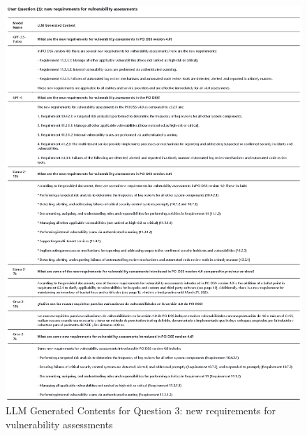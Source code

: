 \documentclass[runningheads]{llncs}
\begin{document}
\begin{figure}
    \centering
    \includegraphics[width=1.3\linewidth]{figures/question_3.eps}
    \caption{LLM Generated Contents for Question 3: new requirements for vulnerability assessments}
    \label{fig:Question  3}
\end{figure}
\end{document}
